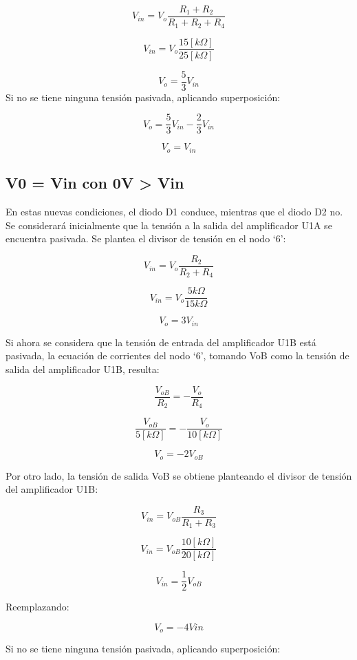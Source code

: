 \[V_{in} = V_o \frac{R_1+R_2}{R_1+R_2+R_4}\]

\[V_{in} = V_o \frac{15[k\Omega]}{25[k\Omega]}\]

\[V_o = \frac{5}{3}V_{in}\]
Si no se tiene ninguna tensión pasivada, aplicando superposición:

\[V_o = \frac{5}{3}V_{in} - \frac{2}{3}V_{in}\]

\[V_o = V_{in}\]


\subsection{V0 = Vin con 0V > Vin}


En estas nuevas condiciones, el diodo D1 conduce, mientras que el diodo D2 no. Se considerará inicialmente que la tensión a la salida del amplificador U1A se encuentra pasivada. Se plantea el divisor de tensión en el nodo ‘6’:

\[V_{in} = V_o \frac{R_2}{R_2+R_4}\]

\[V_{in} = V_o \frac{5 k\Omega}{15 k\Omega }\]

\[V_o = 3V_{in}\]

Si ahora se considera que la tensión de entrada del amplificador U1B está pasivada, la ecuación de corrientes del nodo ‘6’, tomando VoB como la tensión de salida del amplificador U1B, resulta:

\begin{equation}
\frac{V_{oB}}{R_2} = - \frac{V_o}{R_4}
\end{equation}

\begin{equation}
\frac{V_{oB}}{5 [k\Omega]} = - \frac{V_o}{10 [k\Omega]}
\end{equation}

\begin{equation}
V_o = - 2V_{oB}
\end{equation}

Por otro lado, la tensión de salida VoB se obtiene planteando el divisor de tensión del amplificador U1B:

\[V_{in} = V_{oB} \frac{R_3}{R_1+R_3}\]

\[V_{in} = V_{oB} \frac{10 [k\Omega]}{20 [k\Omega]}\]

\[V_{in} = \frac{1}{2}V_{oB}\]

Reemplazando:

\[V_o = - 4V{in}\]

Si no se tiene ninguna tensión pasivada, aplicando superposición:

